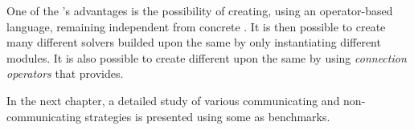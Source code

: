 One of the \posl's advantages is the possibility of creating, using an operator-based language, \ass{} remaining independent from concrete \bothmodules{}. It is then possible to create many different solvers builded upon the same \as{} by only instantiating different modules. It is also possible to create different \comstrs{} upon the same \soset{} by using {\it connection operators} that \posl{} provides.

In the next chapter, a detailed study of various communicating and non-communicating strategies is presented using some \CSPs{} as benchmarks. %